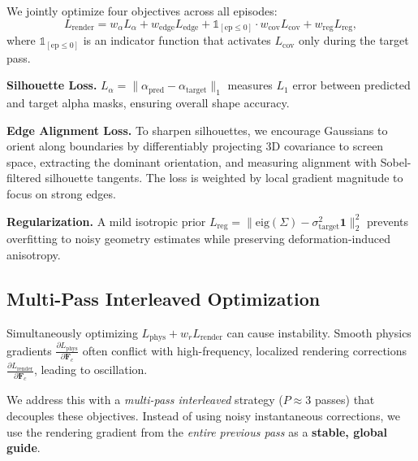     We jointly optimize four objectives across all episodes:
    \begin{equation}
    \label{eq:render_total}
    L_{\text{render}} = w_\alpha L_\alpha + w_{\text{edge}} L_{\text{edge}}
    + \mathbb{1}_{[\text{ep}\leq 0]} \cdot w_{\text{cov}} L_{\text{cov}} + w_{\text{reg}} L_{\text{reg}},
    \end{equation}
    where $\mathbb{1}_{[\text{ep}\leq 0]}$ is an indicator function that activates $L_{\text{cov}}$ only during the target pass.
    
\noindent\textbf{Silhouette Loss.}
    $L_\alpha = \| \alpha_{\text{pred}} - \alpha_{\text{target}} \|_1$ measures 
    $L_1$ error between predicted and target alpha masks, ensuring overall shape accuracy.

\noindent\textbf{Edge Alignment Loss.}
    To sharpen silhouettes, we encourage Gaussians to orient along boundaries by differentiably projecting 3D covariance to screen space, extracting the dominant orientation, and measuring alignment with Sobel-filtered silhouette tangents. The loss is weighted by local gradient magnitude to focus on strong edges.
        
\noindent\textbf{Regularization.}
    A mild isotropic prior 
    $L_{\text{reg}} = \| \text{eig}(\Sigma) - \sigma_{\text{target}}^2 \mathbf{1} \|_2^2$ 
    prevents overfitting to noisy geometry estimates while preserving deformation-induced anisotropy.

\subsection{Multi-Pass Interleaved Optimization}
\label{sec:optimization}

    Simultaneously optimizing $L_{\text{phys}} + w_r L_{\text{render}}$ can cause instability. Smooth physics gradients $\frac{\partial L_{\text{phys}}}{\partial \mathbf{F}_c}$ often conflict with high-frequency, localized rendering corrections $\frac{\partial L_{\text{render}}}{\partial \mathbf{F}_c}$, leading to oscillation.
    
    We address this with a \emph{multi-pass interleaved} strategy ($P{\approx}3$ passes) that decouples these objectives. Instead of using noisy instantaneous corrections, we use the rendering gradient from the \emph{entire previous pass} as a \textbf{stable, global guide}.
    
